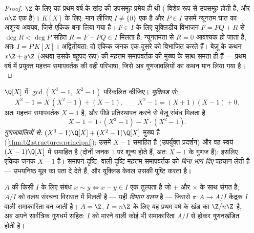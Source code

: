 \begin{proof}
$\Z$ के लिए यह प्रथम वर्ष के खंड की उपसमूह-प्रमेय ही थी ( विशेष
रूप से उपसमूह होती है, और $n\Z$ एक  है)। $K[X]$ के लिए: मान लीजिए
$I \neq \{0\}$ एक  है और $P \in I$ उसमें न्यूनतम घात का अशून्य अवयव, जिसे एकिक
बना लिया गया है। $F \in I$ के लिए यूक्लिडीय विभाजन $F = PQ + R$ से $\deg R < \deg P$ सहित $R = F - PQ \in I$
मिलता है: न्यूनतमता से $R
= 0$ आवश्यक हो जाता है, अतः $I = P\,K[X]$। अद्वितीयता:
दो एकिक जनक एक-दूसरे को विभाजित करते हैं। बेज़ू के कथन  $x\Z +
y\Z$
(अथवा उसके बहुपद-रूप) की महत्तम समापवर्तक की मुख्य  के साथ
समता ही हैं --- प्रथम वर्ष में प्रयुक्त महत्तम समापवर्तक की वही
परिभाषा, जिसे अब गुणजावलियों का कथन मान लिया गया है।
\end{proof}

\begin{example}\label{ex:b2:structures:polygcd}
$\Q[X]$ में $\gcd(X^3 - 1,\ X^2 - 1)$ परिकलित कीजिए। \emph{यूक्लिड से:}
\[
X^3 - 1 = X\,(X^2 - 1) + (X - 1),
\qquad
X^2 - 1 = (X + 1)(X - 1) + 0 ,
\]
अतः महत्तम समापवर्तक $X - 1$ है, और पीछे प्रतिस्थापन करने से बेज़ू संबंध
मिलता है
\[
X - 1 = 1\cdot(X^3 - 1) - X\cdot(X^2 - 1).
\]
\emph{गुणजावलियों से:}  $(X^3 - 1)\Q[X] + (X^2 - 1)\Q[X]$ मुख्य है (\cref{thm:b2:structures:principal}); उसमें $X -
1$
समाहित है (उपर्युक्त प्रदर्शन) और वह स्वयं $(X - 1)\Q[X]$ में समाहित है (दोनों
जनक $1$ पर शून्य होते हैं, अतः $X - 1$ के गुणज हैं): इसलिए एकिक जनक
$X - 1$ है। समापन दृष्टि:  वाली दृष्टि महत्तम समापवर्तक को
\emph{बिना भाग दिए} पहचान लेती है --- उभयनिष्ठ मूल  का पता दे
देते हैं, और यूक्लिड केवल उसकी पुष्टि करता है।
\end{example}

\begin{definition}[विभाग वलय $\Z/n\Z$, पुनरावलोकन]\label{def:b2:structures:quotientring}
$A$ की किसी  $I$ के लिए संबंध $x \sim y \iff x - y \in I$ एक तुल्यता है जो $+$ और $\times$
के साथ संगत है;  $A/I$ को वलय संरचना विरासत में मिलती है
--- यही \emph{विभाग वलय} है --- जिससे $\pi \colon A \to A/I$ केंद्रक $I$
वाली समाकारिता बन जाती है। $A = \Z$, $I = n\Z$ के लिए यह प्रथम वर्ष के खंड का
$\Z/n\Z$ है, अब अपने सार्वत्रिक गुणधर्म सहित: $I$ को मारने वाली कोई भी
समाकारिता $A/I$ से होकर गुणनखंडित होती है।
\end{definition}

